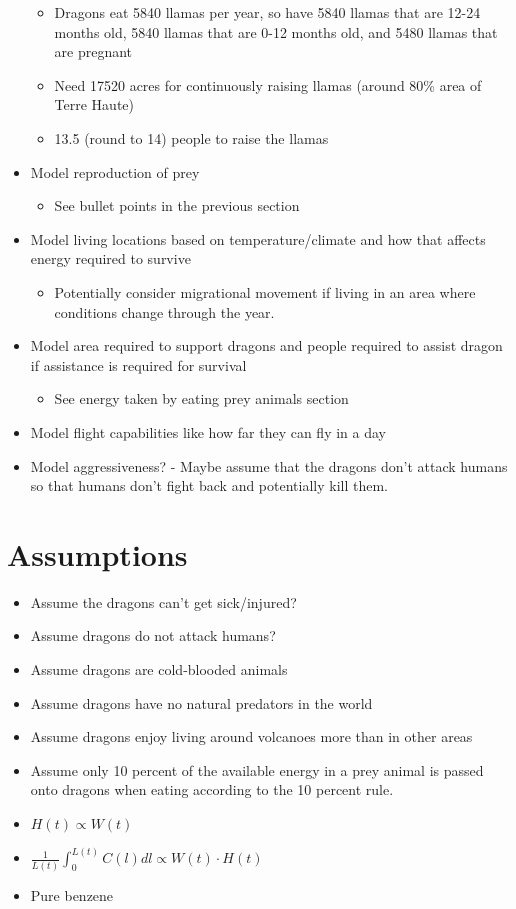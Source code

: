 \documentclass{article}
\begin{document}
\begin{itemize}
\begin{itemize}
    \item Dragons eat 5840 llamas per year, so have 5840 llamas that are 12-24 months old, 5840 llamas that are 0-12 months old, and 5480 llamas that are pregnant
    \item Need 17520 acres for continuously raising llamas (around 80\% area of Terre Haute)
    \item 13.5 (round to 14) people to raise the llamas
\end{itemize}
\item Model reproduction of prey
\begin{itemize}
    \item See bullet points in the previous section
\end{itemize}
\item Model living locations based on temperature/climate and how that affects energy required to survive
\begin{itemize}
    \item Potentially consider migrational movement if living in an area where conditions change through the year. 
\end{itemize} 
\item Model area required to support dragons and people required to assist dragon if assistance is required for survival
\begin{itemize}
    \item See energy taken by eating prey animals section
\end{itemize}
\item Model flight capabilities like how far they can fly in a day
\item Model aggressiveness? - Maybe assume that the dragons don't attack humans so that humans don't fight back and potentially kill them. 
\end{itemize}


\section{Assumptions}
\begin{itemize}
\item Assume the dragons can't get sick/injured?
\item Assume dragons do not attack humans?
\item Assume dragons are cold-blooded animals
\item Assume dragons have no natural predators in the world
\item Assume dragons enjoy living around volcanoes more than in other areas
\item Assume only 10 percent of the available energy in a prey animal is passed onto dragons when eating according to the 10 percent rule.
\item $H(t)\propto W(t)$
\item $\frac{1}{L(t)}\int_0^{L(t)}C(l)dl\propto W(t)\cdot H(t)$
\item Pure benzene
\end{itemize}
\end{document}
